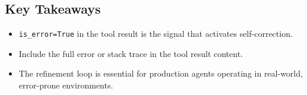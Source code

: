\subsection*{Key Takeaways}
\begin{itemize}
    \item \texttt{is\_error=True} in the tool result is the signal that activates self-correction.
    \item Include the full error or stack trace in the tool result content.
    \item The refinement loop is essential for production agents operating in real-world, error-prone environments.
\end{itemize}
